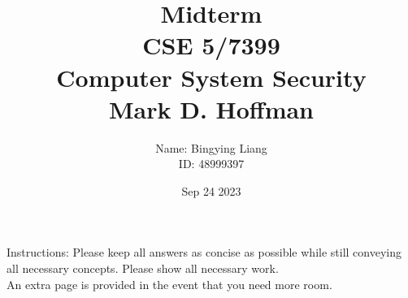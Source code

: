 \documentclass[12pt]{article}
\title{Midterm \\
CSE 5/7399 \\
Computer System Security\\
Mark D. Hoffman}
\author{
Name: Bingying Liang \\
ID: 48999397}
\date{Sep 24 2023}
\begin{document}
\maketitle

Instructions: Please keep all answers as concise as possible while still conveying all necessary concepts. Please show all necessary work.\\
An extra page is provided in the event that you need more room.

\begin{enumerate}
\end{enumerate}
\end{document}

